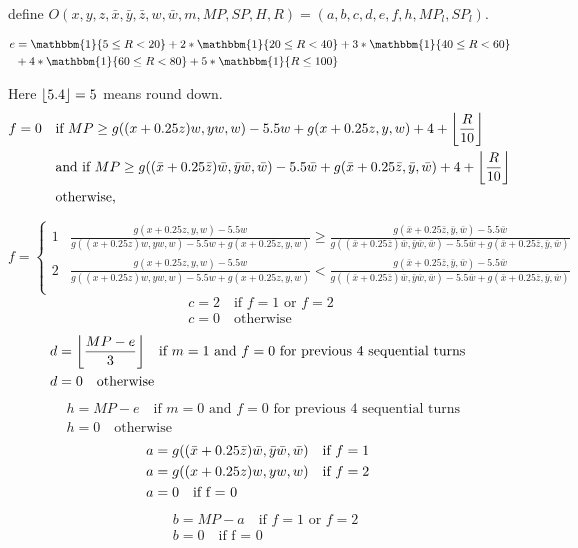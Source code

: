 \documentclass[12pt]{article}
\DeclarePairedDelimiter\floor{\lfloor}{\rfloor}
\begin{document}
define $O(x,y,z,\bar{x},\bar{y},\bar{z},w,\bar{w},m,MP,SP,H,R) = (a,b,c,d,e,f,h,MP_l,SP_l)$.

\begin{align*}
e &= \mathbbm{1}\{5 \leq R <20\}	+2* \mathbbm{1}\{20 \leq R <40\} +	3*\mathbbm{1}\{40 \leq R <60\}\\
&+ 4*\mathbbm{1}\{60 \leq R <80\}	+ 5*\mathbbm{1}\{R \leq 100\} 
\end{align*}

Here $\floor*{5.4} = 5$ means round down.
\begin{align*}
	f = 0 \quad &\text{if $MP \geq g((x+0.25z)w,yw,w) - 5.5w + g(x+0.25z,y,w)+4 + \floor*{\frac{R}{10}}$}\quad \\ &\text{and if $MP \geq g((\bar{x}+0.25\bar{z})\bar{w},\bar{y}\bar{w},\bar{w}) - 5.5\bar{w} + g(\bar{x}+0.25\bar{z},\bar{y},\bar{w})+4 + \floor*{\frac{R}{10}}$}\\ &\text{otherwise,}
\end{align*}

\begin{equation*}
  f =
    \begin{cases}
      1 & \frac{g(x+0.25z,y,w)-5.5w}{g((x+0.25z)w,yw,w) - 5.5w + g(x+0.25z,y,w)} \geq \frac{g(\bar{x}+0.25\bar{z},\bar{y},\bar{w})-5.5\bar{w}}{g((\bar{x}+0.25\bar{z})\bar{w},\bar{y}\bar{w},\bar{w}) - 5.5\bar{w} + g(\bar{x}+0.25\bar{z},\bar{y},\bar{w})}  \\
      2 & \frac{g(x+0.25z,y,w)-5.5w}{g((x+0.25z)w,yw,w) - 5.5w + g(x+0.25z,y,w)} < \frac{g(\bar{x}+0.25\bar{z},\bar{y},\bar{w})-5.5\bar{w}}{g((\bar{x}+0.25\bar{z})\bar{w},\bar{y}\bar{w},\bar{w}) - 5.5\bar{w} + g(\bar{x}+0.25\bar{z},\bar{y},\bar{w})}  \\
    \end{cases}       
\end{equation*}
\begin{align*}
& c = 2 \quad \text{if $f = 1$ or $f=2$ }\\
&c=0 \quad\text{otherwise}	
\end{align*}
 \begin{align*}
& d = \floor*{\frac{MP-e}{3}} \quad \text{if $m=1$ and $f = 0$ for previous $4$ sequential turns }\\
&d=0 \quad\text{otherwise}	
\end{align*}
 \begin{align*}
& h = MP-e\quad \text{if $m=0$ and $f = 0$ for previous $4$ sequential turns }\\
&h=0 \quad\text{otherwise}	
\end{align*}
\begin{align*}
& a = g((\bar{x}+0.25\bar{z})\bar{w},\bar{y}\bar{w},\bar{w}) \quad \text{if $f = 1$}\\
& a = g((x+0.25z)w,yw,w) \quad \text{if $ f = 2$ }\\
&a=0 \quad\text{if f = 0}	
\end{align*}
 \begin{align*}
& b = MP-a \quad \text{if $f = 1$ or $f = 2$}\\
&b=0 \quad\text{if f = 0}	
\end{align*}
\end{document}
